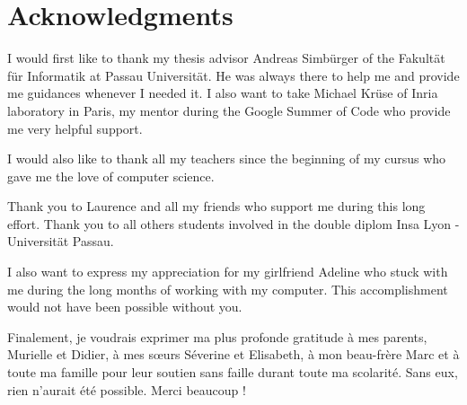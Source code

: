 
\begingroup
\let\clearpage\relax
\let\cleardoublepage\relax
\let\cleardoublepage\relax
\chapter*{Acknowledgments}
I would first like to thank my thesis advisor Andreas Simbürger of the Fakultät für Informatik at Passau Universität. He was always there to help me and provide me guidances whenever I needed it. 
I also want to take Michael Krüse of Inria laboratory in Paris, my mentor during the Google Summer of Code who provide me very helpful support.

\bigskip

I would also like to thank all my teachers since the beginning of my cursus who gave me the love of computer science.

\bigskip

Thank you to Laurence and all my friends who support me during this long effort.
Thank you to all others students involved in the double diplom Insa Lyon - Universität Passau.

\bigskip

I also want to express my appreciation for my girlfriend Adeline who stuck with me during the long months of working with my computer. This accomplishment would not have been possible without you. 

\bigskip

Finalement, je voudrais exprimer ma plus profonde gratitude à mes parents, Murielle et Didier, à mes sœurs Séverine et Elisabeth, à mon beau-frère Marc et à toute ma famille pour leur soutien sans faille durant toute ma scolarité. Sans eux, rien n'aurait été possible. Merci beaucoup !

\endgroup




